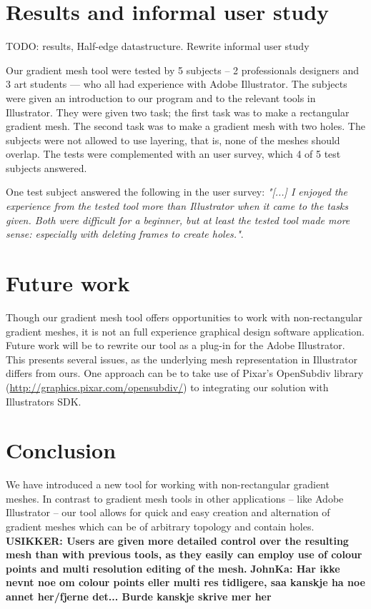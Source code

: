 \documentclass{egpubl}
\newcommand{\note}[3]{{\color{#2}\textbf{#1: #3}}}
\newcommand{\john}[1]{\note{JohnKa}{RubineRed}{#1}}
\newcommand{\unsure}[1]{\note{USIKKER}{Green}{#1}}
\begin{document}
	\section{Results and informal user study}
	\label{sec:results}
	
	TODO: results, Half-edge datastructure. Rewrite informal user study
	
	Our gradient mesh tool were tested by 5 subjects -- 2 professionals designers and 3 art students --- who all had experience with Adobe Illustrator. The subjects were given an introduction to our program and to the relevant tools in Illustrator. They were given two task; the first task was to make a rectangular gradient mesh. The second task was to make a gradient mesh with two holes. The subjects were not allowed to use layering, that is, none of the meshes should overlap. The tests were complemented with an user survey, which 4 of 5 test subjects answered.
	
	One test subject answered the following in the user survey: \textit{"[...] I enjoyed the experience from the tested tool more than Illustrator when it came to the tasks given. Both were difficult for a beginner, but at least the tested tool made more sense: especially with deleting frames to create holes."}.
	
	\section{Future work}
	\label{sec:FW}
	
	Though our gradient mesh tool offers opportunities to work with non-rectangular gradient meshes, it is not an full experience graphical design software application. Future work will be to rewrite our tool as a plug-in for the Adobe Illustrator. This presents several issues, as the underlying mesh representation in Illustrator differs from ours. One approach can be to take use of Pixar's OpenSubdiv library (\url{http://graphics.pixar.com/opensubdiv/}) to integrating our solution with Illustrators SDK.
	
	\section{Conclusion}
	
	We have introduced a new tool for working with non-rectangular gradient meshes. In contrast to gradient mesh tools in other applications -- like Adobe Illustrator -- our tool allows for quick and easy creation and alternation of gradient meshes which can be of arbitrary topology and contain holes. \unsure{Users are given more detailed control over the resulting mesh than with previous tools, as they easily can employ use of colour points and multi resolution editing of the mesh.}  \john{Har ikke nevnt noe om colour points eller multi res tidligere, saa kanskje ha noe annet her/fjerne det... Burde kanskje skrive mer her}
	
	
	
	
	
\end{document}
